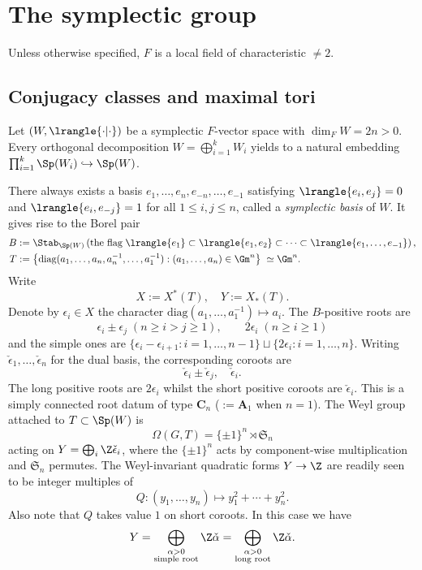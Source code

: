 \documentclass[a4paper,10pt]{article}
\begin{document}
\section{The symplectic group}\label{sec:Sp-gen}
Unless otherwise specified, $F$ is a local field of characteristic $\neq 2$.

\subsection{Conjugacy classes and maximal tori}\label{sec:Sp}
Let $(W, \lrangle{\cdot|\cdot})$ be a symplectic $F$-vector space with $\dim_F W = 2n > 0$. Every orthogonal decomposition $W = \bigoplus_{i=1}^k W_i$ yields to a natural embedding $\prod_{i=1}^k \Sp(W_i) \hookrightarrow \Sp(W)$.

There always exists a basis $e_1, \ldots, e_n, e_{-n}, \ldots, e_{-1}$ satisfying $\lrangle{e_i, e_j}=0$ and $\lrangle{e_i, e_{-j}}=1$ for all $1 \leq i,j \leq n$, called a \emph{symplectic basis} of $W$. It gives rise to the Borel pair
\begin{align*}
	B & := \Stab_{\Sp(W)}\left( \text{the flag}\; \lrangle{e_1} \subset \lrangle{e_1, e_2} \subset \cdots \subset \lrangle{e_1, \ldots, e_{-1}} \right), \\
	T & := \left\{ \text{diag}(a_1, \ldots, a_n, a_n^{-1}, \ldots, a_1^{-1}) : (a_1, \ldots, a_n) \in \Gm^n \right\} \; \simeq \Gm^n.
\end{align*}
Write
\[ X := X^*(T), \quad Y := X_*(T). \]
Denote by $\epsilon_i \in X$ the character $\text{diag}(a_1, \ldots, a_1^{-1}) \mapsto a_i$. The $B$-positive roots are
\[ \epsilon_i \pm \epsilon_j \; (n \geq i>j \geq 1), \qquad 2\epsilon_i\; (n \geq i \geq 1) \]
and the simple ones are $\{ \epsilon_i - \epsilon_{i+1}: i=1, \ldots, n-1 \} \sqcup \{2\epsilon_i: i=1, \ldots, n\}$. Writing $\check{\epsilon}_1, \ldots, \check{\epsilon}_n$ for the dual basis, the corresponding coroots are
\[ \check{\epsilon}_i \pm \check{\epsilon}_j, \quad \check{\epsilon}_i. \]
The long positive roots are $2\epsilon_i$ whilst the short positive coroots are $\check{\epsilon}_i$. This is a simply connected root datum of type $\mathbf{C}_n$ ($ :=\mathbf{A}_1$ when $n=1$). The Weyl group attached to $T \subset \Sp(W)$ is
\[ \Omega(G,T) = \{\pm 1\}^n \rtimes \mathfrak{S}_n \]
acting on $Y = \bigoplus_i \Z\check{\epsilon}_i$, where the $\{\pm 1\}^n$ acts by component-wise multiplication and $\mathfrak{S}_n$ permutes. The Weyl-invariant quadratic forms $Y \to \Z$ are readily seen to be integer multiples of
\begin{equation}\label{eqn:Y-Sp}
	Q: (y_1, \ldots, y_n) \mapsto y_1^2 + \cdots + y_n^2.
\end{equation}
Also note that $Q$ takes value $1$ on short coroots. In this case we have
\[ Y = \bigoplus_{\substack{\alpha > 0 \\ \text{simple root}}} \Z\check{\alpha} = \bigoplus_{\substack{\alpha > 0\\ \text{long root}}} \Z\check{\alpha}. \]
\end{document}
